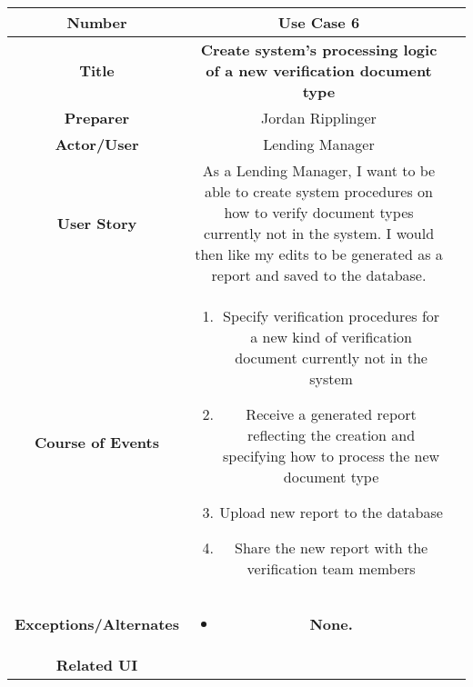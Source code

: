 \begin{table}[H]
    \centering
    \begin{tabularx}{0.75\linewidth}{||Sc|X||}
        \hline
        \hline
        \textbf{Number} & \textbf{Use Case 6} \\
        \hline
        \textbf{Title} & \textbf{Create system's processing logic of a new verification document type}\\
        \hline
        \textbf{Preparer} & Jordan Ripplinger \\
        \hline
        \textbf{Actor/User} & Lending Manager \\
        \hline
        \textbf{User Story} &
        As a Lending Manager, I want to be able to create system procedures on how to verify document types currently not in the system. I would then like my edits to be generated as a report and saved to the database. \\
        \hline
        \textbf{Course of Events} &
        \begin{minipage}[l]{\linewidth}
            \begin{enumerate}[wide, labelindent=0pt]
                \item Specify verification procedures for a new kind of verification document currently not in the system
                \item Receive a generated report reflecting the creation and specifying how to process the new document type
                \item Upload new report to the database
                \item Share the new report with the verification team members
            \end{enumerate}
            \vspace{4pt}
        \end{minipage} \\
        \hline
        \textbf{Exceptions/Alternates} & 
        \begin{minipage}[l]{\linewidth}
            \vspace{2pt}
            \begin{itemize}[wide, labelindent=0pt]
                \item \textbf{None.}
            \end{itemize}
        \end{minipage} \\
        \hline
        \textbf{Related UI} & 
        \begin{minipage}[l]{\linewidth}

\end{minipage}
\end{tabularx}
\end{table}
